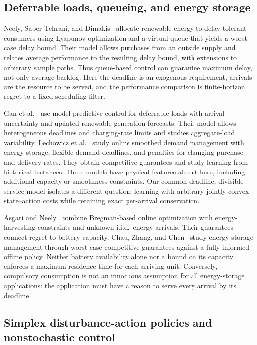 \documentclass[11pt]{article}
\theoremstyle{plain}
\theoremstyle{remark}
\numberwithin{equation}{section}
\begin{document}
\subsection{Deferrable loads, queueing, and energy storage}

Neely, Saber Tehrani, and Dimakis~\cite{neely2010renewable} allocate
renewable energy to delay-tolerant consumers using Lyapunov optimization
and a virtual queue that yields a worst-case delay bound. Their model
allows purchases from an outside supply and relates average performance
to the resulting delay bound, with extensions to arbitrary sample paths.
Thus queue-based control can guarantee maximum delay, not only average
backlog. Here the deadline is an exogenous requirement, arrivals are the
resource to be served, and the performance comparison is finite-horizon
regret to a fixed scheduling filter.

Gan et al.~\cite{gan2013deferrable} use model predictive control for
deferrable loads with arrival uncertainty and updated renewable-generation
forecasts. Their model allows heterogeneous deadlines and charging-rate
limits and studies aggregate-load variability. Lechowicz
et al.~\cite{lechowicz2026smoothed} study online smoothed demand management
with energy storage, flexible demand deadlines, and penalties for changing
purchase and delivery rates. They obtain competitive guarantees and
study learning from historical instances. These models have physical
features absent here, including additional capacity or smoothness
constraints. Our common-deadline, divisible-service model isolates a
different question: learning with arbitrary jointly convex state--action
costs while retaining exact per-arrival conservation.

Asgari and Neely~\cite{10.1145/3428337} combine Bregman-based online
optimization with energy-harvesting constraints and unknown i.i.d.\
energy arrivals. Their guarantees connect regret to battery capacity.
Chau, Zhang, and Chen~\cite{chau2016cost} study energy-storage management
through worst-case competitive guarantees against a fully informed
offline policy. Neither battery availability alone nor a bound on its
capacity enforces a maximum residence time for each arriving unit.
Conversely, compulsory consumption is not an innocuous assumption for
all energy-storage applications: the application must have a reason to
serve every arrival by its deadline.

\subsection{Simplex disturbance-action policies and nonstochastic control}
\label{ch6:subsec:related-control}
\end{document}
